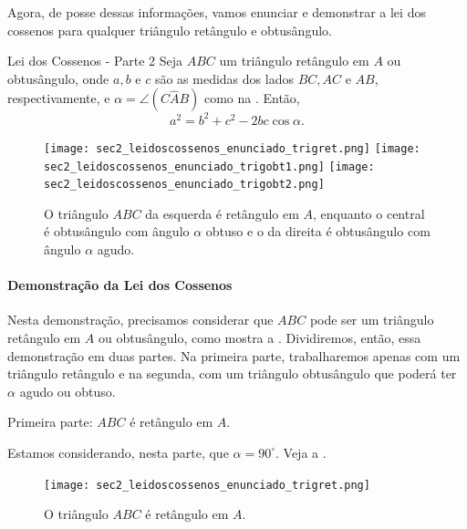 Agora, de posse dessas informações, vamos enunciar e demonstrar a lei dos cossenos para qualquer triângulo retângulo e obtusângulo. 

\begin{observationtitle}{Lei dos Cossenos - Parte 2}
\leavevmode{}\label{sec2_leidoscossenos_parte2}
Seja $ABC$ um triângulo retângulo em $A$ ou obtusângulo, onde $a, b$ e $c$ são as medidas dos lados $BC, AC$ e $AB$, respectivamente, e $\alpha=\angle(C\hat{A}B)$ como na . Então,
\begin{equation}\label{sec2_leidoscossenos_eq2}
    a^2=b^2+c^2-2bc\cos\alpha.
\end{equation}
\begin{figure}[H]
    \centering
    \texttt{[image: sec2\_leidoscossenos\_enunciado\_trigret.png]}
    \texttt{[image: sec2\_leidoscossenos\_enunciado\_trigobt1.png]}
    \texttt{[image: sec2\_leidoscossenos\_enunciado\_trigobt2.png]}
    \caption{O triângulo $ABC$ da esquerda é retângulo em $A$, enquanto o central é obtusângulo com ângulo $\alpha$ obtuso e o da direita é obtusângulo com ângulo $\alpha$ agudo.}
    \label{sec2_leidoscossenos_enunciado2}
\end{figure}
\end{observationtitle}

\paragraph{Demonstração da Lei dos Cossenos}
\label{sec2_leidoscossenos_demo2}

Nesta demonstração, precisamos considerar que $ABC$ pode ser um triângulo retângulo em $A$ ou obtusângulo, como mostra a . Dividiremos, então, essa demonstração em duas partes. Na primeira parte, trabalharemos apenas com um triângulo retângulo e na segunda, com um triângulo obtusângulo que poderá ter $\alpha$ agudo ou obtuso.

Primeira parte: $ABC$ é retângulo em $A$.

Estamos considerando, nesta parte, que $\alpha=90^\circ$. Veja a .

\begin{figure}[H]
    \centering
    \texttt{[image: sec2\_leidoscossenos\_enunciado\_trigret.png]}
     \caption{O triângulo $ABC$ é retângulo em $A$.}
    \label{sec2_leidoscossenos_fig_demoret1}
\end{figure}

